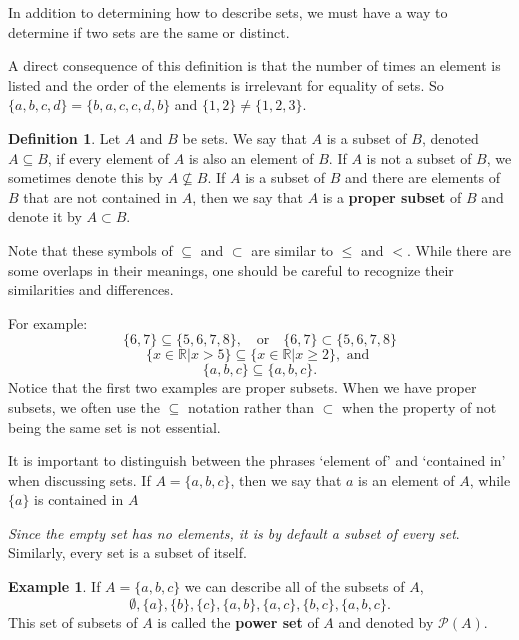 \documentclass[
]{book}
\theoremstyle{definition}
\newtheorem{definition}{Definition}[chapter]
\theoremstyle{definition}
\newtheorem{example}{Example}[chapter]
\theoremstyle{definition}
\theoremstyle{definition}
\theoremstyle{remark}
\begin{document}
In addition to determining how to describe sets, we must have a way to determine if two sets are the same or distinct.

A direct consequence of this definition is that the number of times an element is listed and the order of the elements is irrelevant for equality of sets. So \(\{a, b, c, d\}=\{b, a, c, c, d, b\}\) and \(\{1, 2\} \neq \{1, 2, 3\}\).

\begin{definition}
\protect\hypertarget{def:subset}{}\label{def:subset}Let \(A\) and \(B\) be sets. We say that \(A\) is a subset of \(B\), denoted \(A \subseteq B\), if every element of \(A\) is also an element of \(B\). If \(A\) is not a subset of \(B\), we sometimes denote this by \(A\nsubseteq B\). If \(A\) is a subset of \(B\) and there are elements of \(B\) that are not contained in \(A\), then we say that \(A\) is a \textbf{proper subset} of \(B\) and denote it by \(A\subset B\).
\end{definition}

Note that these symbols of \(\subseteq\) and \(\subset\) are similar to \(\leq\) and \(<\). While there are some overlaps in their meanings, one should be careful to recognize their similarities and differences.

For example:
\[\{6, 7 \} \subseteq \{5, 6, 7, 8\}, \quad \mbox{or} \quad \{6, 7 \} \subset \{5, 6, 7, 8\}\]
\[\{x\in \mathbb{R} \vert x>5\} \subseteq \{x\in \mathbb{R} \vert x \geq 2\}, \mbox{ and }\]
\[\{a,b,c\} \subseteq \{a,b,c\}.\]
Notice that the first two examples are proper subsets. When we have proper subsets, we often use the \(\subseteq\) notation rather than \(\subset\) when the property of not being the same set is not essential.

It is important to distinguish between the phrases `element of' and `contained in' when discussing sets. If \(A= \{a,b,c\}\), then we say that \(a\) is an element of \(A\), while \(\{a\}\) is contained in \(A\)

\emph{Since the empty set has no elements, it is by default a subset of every set}. Similarly, every set is a subset of itself.

\begin{example}
If \(A=\{a,b,c\}\) we can describe all of the subsets of \(A\),
\[\emptyset, \{a\}, \{b\}, \{c\}, \{a,b\}, \{a,c\}, \{b,c\}, \{a, b, c\}.\]
This set of subsets of \(A\) is called the \textbf{power set} of \(A\) and denoted by \(\mathcal{P}(A)\).
\end{example}
\end{document}
